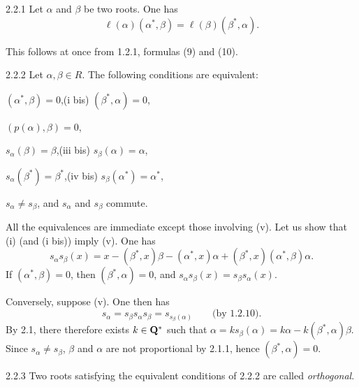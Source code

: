 \begin{lemma}{2.2.1}\label{XXI.2.2.1}
Let $\alpha$ and $\beta$ be two roots. One has
\begin{equation}\tag{11}\label{XXI.eq.11}
\ell(\alpha)(\alpha^*,\beta)=\ell(\beta)(\beta^*,\alpha).
\end{equation}
\end{lemma}
This follows at once from 1.2.1, formulas (9) and (10).
\begin{corollary}{2.2.2}\label{XXI.2.2.2}
Let $\alpha,\beta\in R$. The following conditions are equivalent:
\begin{enumeratei}
\item $(\alpha^*,\beta)=0$,\qquad(i bis) $(\beta^*,\alpha)=0$,
\item $(p(\alpha),\beta)=0$,
\item $s_\alpha(\beta)=\beta$,\qquad(iii bis) $s_\beta(\alpha)=\alpha$,
\item $s_\alpha(\beta^*)=\beta^*$,\qquad(iv bis) $s_\beta(\alpha^*)=\alpha^*$,
\item $s_\alpha\ne s_\beta$, and $s_\alpha$ and $s_\beta$ commute.
\end{enumeratei}
\end{corollary}
All the equivalences are immediate except those involving (v). Let us show that (i) (and (i bis)) imply (v). One has
\[
s_\alpha s_\beta(x)=x-(\beta^*,x)\beta-(\alpha^*,x)\alpha+(\beta^*,x)(\alpha^*,\beta)\alpha.
\]
If $(\alpha^*,\beta)=0$, then $(\beta^*,\alpha)=0$, and $s_\alpha s_\beta(x)=s_\beta s_\alpha(x)$.

Conversely, suppose (v). One then has
\[
s_\alpha=s_\beta s_\alpha s_\beta=s_{s_\beta(\alpha)}\qquad\text{(by 1.2.10).}
\]
By 2.1, there therefore exists $k\in\mathbf{Q}^*$ such that $\alpha=ks_\beta(\alpha)=k\alpha-k(\beta^*,\alpha)\beta$. Since $s_\alpha\ne s_\beta$, $\beta$ and $\alpha$ are not proportional by 2.1.1, hence $(\beta^*,\alpha)=0$.
\begin{definition}{2.2.3}\label{XXI.2.2.3}
Two roots satisfying the equivalent conditions of 2.2.2 are called \emph{orthogonal}.
\end{definition}
